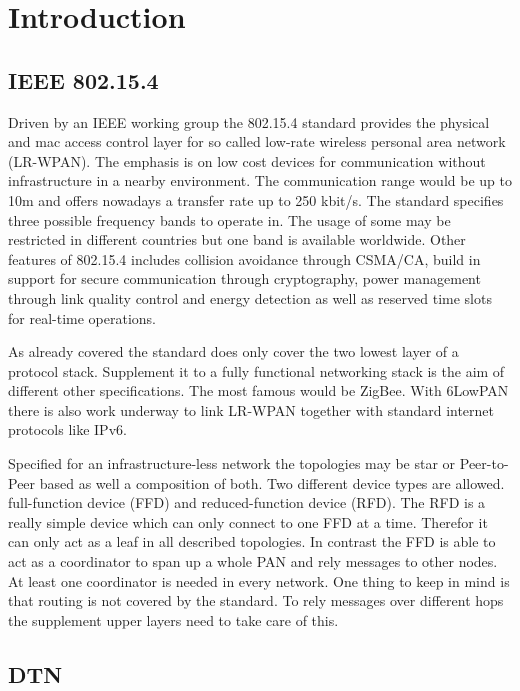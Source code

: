 \chapter{Introduction}

\section{IEEE 802.15.4}

Driven by an IEEE working group the 802.15.4 standard provides the physical and
mac access control layer for so called low-rate wireless personal area network
(LR-WPAN). The emphasis is on low cost devices for communication without
infrastructure in a nearby environment. The communication range would be up to
10m and offers nowadays a transfer rate up to 250 kbit/s. The standard specifies
three possible frequency bands to operate in. The usage of some may be
restricted in different countries but one band is available worldwide. Other
features of 802.15.4 includes collision avoidance through CSMA/CA, build in
support for secure communication through cryptography, power management through
link quality control and energy detection as well as reserved time slots for
real-time operations.

As already covered the standard does only cover the two lowest layer of a
protocol stack. Supplement it to a fully functional networking stack is the aim
of different other specifications. The most famous would be ZigBee. With 6LowPAN
there is also work underway to link LR-WPAN together with standard internet
protocols like IPv6.

Specified for an infrastructure-less network the topologies may be star or
Peer-to-Peer based as well a composition of both. Two different device types are
allowed. full-function device (FFD) and reduced-function device (RFD). The RFD
is a really simple device which can only connect to one FFD at a time. Therefor
it can only act as a leaf in all described topologies. In contrast the FFD is
able to act as a coordinator to span up a whole PAN and rely messages to other
nodes. At least one coordinator is needed in every network. One thing to keep in
mind is that routing is not covered by the standard. To rely messages over
different hops the supplement upper layers need to take care of this.

\section{DTN}

